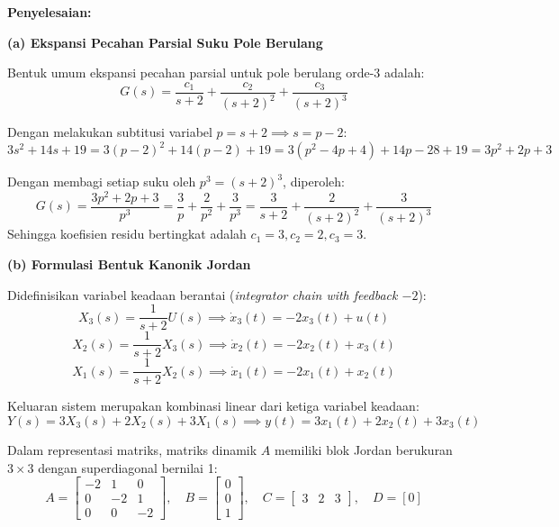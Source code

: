 \documentclass[11pt,a4paper]{article}
\begin{document}
\textbf{Penyelesaian:}

\textbf{(a) Ekspansi Pecahan Parsial Suku Pole Berulang}

Bentuk umum ekspansi pecahan parsial untuk pole berulang orde-3 adalah:
$$G(s) = \frac{c_1}{s + 2} + \frac{c_2}{(s + 2)^2} + \frac{c_3}{(s + 2)^3}$$

Dengan melakukan subtitusi variabel $p = s + 2 \implies s = p - 2$:
$$3s^2 + 14s + 19 = 3(p-2)^2 + 14(p-2) + 19 = 3(p^2 - 4p + 4) + 14p - 28 + 19 = 3p^2 + 2p + 3$$

Dengan membagi setiap suku oleh $p^3 = (s+2)^3$, diperoleh:
$$G(s) = \frac{3p^2 + 2p + 3}{p^3} = \frac{3}{p} + \frac{2}{p^2} + \frac{3}{p^3} = \frac{3}{s + 2} + \frac{2}{(s + 2)^2} + \frac{3}{(s + 2)^3}$$
Sehingga koefisien residu bertingkat adalah $c_1 = 3, c_2 = 2, c_3 = 3$.

\textbf{(b) Formulasi Bentuk Kanonik Jordan}

Didefinisikan variabel keadaan berantai (\textit{integrator chain with feedback $-2$}):
$$X_3(s) = \frac{1}{s+2} U(s) \implies \dot{x}_3(t) = -2 x_3(t) + u(t)$$
$$X_2(s) = \frac{1}{s+2} X_3(s) \implies \dot{x}_2(t) = -2 x_2(t) + x_3(t)$$
$$X_1(s) = \frac{1}{s+2} X_2(s) \implies \dot{x}_1(t) = -2 x_1(t) + x_2(t)$$

Keluaran sistem merupakan kombinasi linear dari ketiga variabel keadaan:
$$Y(s) = 3 X_3(s) + 2 X_2(s) + 3 X_1(s) \implies y(t) = 3 x_1(t) + 2 x_2(t) + 3 x_3(t)$$

Dalam representasi matriks, matriks dinamik $A$ memiliki blok Jordan berukuran $3 \times 3$ dengan superdiagonal bernilai 1:
$$A = \begin{bmatrix} -2 & 1 & 0 \\ 0 & -2 & 1 \\ 0 & 0 & -2 \end{bmatrix}, \quad B = \begin{bmatrix} 0 \\ 0 \\ 1 \end{bmatrix}, \quad C = \begin{bmatrix} 3 & 2 & 3 \end{bmatrix}, \quad D = [0]$$
\end{document}
